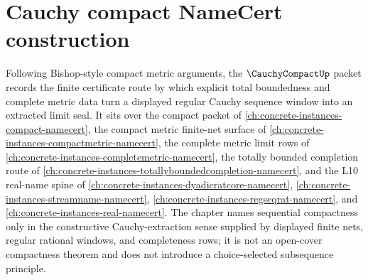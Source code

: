 \chapter{Cauchy compact NameCert construction}
\label{ch:concrete-instances-cauchy-compact-namecert}

Following Bishop-style compact metric arguments, the $\CauchyCompactUp$ packet records the finite certificate route by which explicit total boundedness and complete metric data turn a displayed regular Cauchy sequence window into an extracted limit seal. It sits over the compact packet of \autoref{ch:concrete-instances-compact-namecert}, the compact metric finite-net surface of \autoref{ch:concrete-instances-compactmetric-namecert}, the complete metric limit rows of \autoref{ch:concrete-instances-completemetric-namecert}, the totally bounded completion route of \autoref{ch:concrete-instances-totallyboundedcompletion-namecert}, and the L10 real-name spine of \autoref{ch:concrete-instances-dyadicratcore-namecert}, \autoref{ch:concrete-instances-streamname-namecert}, \autoref{ch:concrete-instances-regseqrat-namecert}, and \autoref{ch:concrete-instances-real-namecert}. The chapter names sequential compactness only in the constructive Cauchy-extraction sense supplied by displayed finite nets, regular rational windows, and completeness rows; it is not an open-cover compactness theorem and does not introduce a choice-selected subsequence principle.

